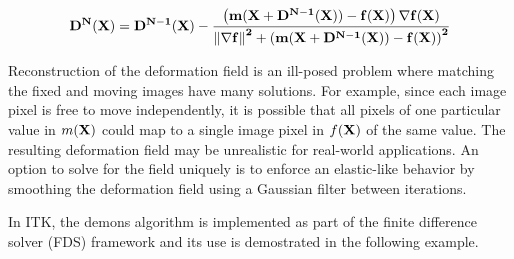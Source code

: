 \begin{equation}
\bf{D}^{N}(\bf{X}) = \bf{D}^{N-1}(\bf{X}) - \frac
{\left(  m(\bf{X}+ \bf{D}^{N-1}(\bf{X})) 
- f(\bf{X}) \right) \nabla f(\bf{X})}
{\left\|  \nabla f \right\|^2 + \left(  
m(\bf{X}+ \bf{D}^{N-1}(\bf{X}) )
 - f(\bf{X}) \right)^2 } 
\label{eqn:DemonsUpdateEquation}
\end{equation}

Reconstruction of the deformation field is an ill-posed problem where
matching the fixed and moving images have many solutions. For example, since
each image pixel is free to move independently, it is possible that all
pixels of one particular value in $m(\bf{X})$ could map to a single image
pixel in $f(\bf{X})$ of the same value. The resulting deformation field may
be unrealistic for real-world applications. An option to solve for the field
uniquely is to enforce an elastic-like behavior by smoothing the deformation
field using a Gaussian filter between iterations.

In ITK, the demons algorithm is implemented as part of the finite difference
solver (FDS) framework and its use is demostrated in the following example.

 

